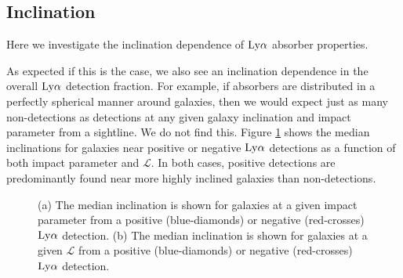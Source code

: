 \documentclass[twocolumn,tighten]{aastex62}
\begin{document}
\subsection{Inclination}

Here we investigate the inclination dependence of $\rm Ly\alpha$ absorber properties.

As expected if this is the case, we also see an inclination dependence in the overall $\rm Ly\alpha$ detection fraction. For example, if absorbers are distributed in a perfectly spherical manner around galaxies, then we would expect just as many non-detections as detections at any given galaxy inclination and impact parameter from a sightline. We do not find this. Figure \ref{detection_fraction_inclination} shows the median inclinations for galaxies near positive or negative $\rm Ly\alpha$ detections as a function of both impact parameter and $\mathcal{L}$. In both cases, positive detections are predominantly found near more highly inclined galaxies than non-detections.



\begin{figure}
\centering
  \caption{\small{(a) The median inclination is shown for galaxies at a given impact parameter from a positive (blue-diamonds) or negative (red-crosses) $\rm Ly\alpha$ detection. (b) The median inclination is shown for galaxies at a given $\mathcal{L}$ from a positive (blue-diamonds) or negative (red-crosses) $\rm Ly\alpha$ detection.}}
  \label{detection_fraction_inclination}
\vspace{0pt}
\end{figure}
\end{document}
